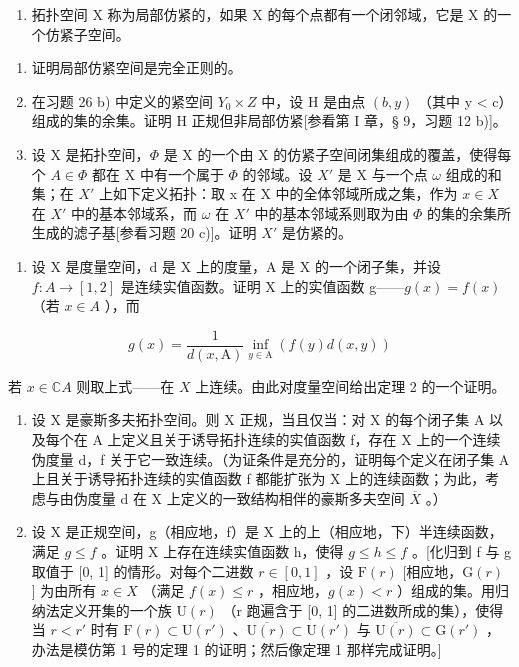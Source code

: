 \begin{enumerate}
\def\labelenumi{\arabic{enumi})}
\setcounter{enumi}{26}
\tightlist
\item
  拓扑空间 X 称为局部仿紧的，如果 X 的每个点都有一个闭邻域，它是 X 的一个仿紧子空间。
\end{enumerate}

\begin{enumerate}
\def\labelenumi{\alph{enumi})}
\item
  证明局部仿紧空间是完全正则的。
\item
  在习题 26 b) 中定义的紧空间 \(Y_{0} \times Z\) 中，设 H 是由点 \((b, y)\) （其中 y \textless{} c）组成的集的余集。证明 H 正规但非局部仿紧{[}参看第 I 章，§ 9，习题 12 b){]}。
\item
  设 X 是拓扑空间，\(\Phi\) 是 X 的一个由 X 的仿紧子空间闭集组成的覆盖，使得每个 \(A \in \Phi\) 都在 X 中有一个属于 \(\Phi\) 的邻域。设 \(X'\) 是 X 与一个点 \(\omega\) 组成的和集；在 \(X'\) 上如下定义拓扑：取 x 在 X 中的全体邻域所成之集，作为 \(x \in X\) 在 \(X'\) 中的基本邻域系，而 \(\omega\) 在 \(X'\) 中的基本邻域系则取为由 \(\Phi\) 的集的余集所生成的滤子基{[}参看习题 20 c){]}。证明 \(X'\) 是仿紧的。
\end{enumerate}

\begin{enumerate}
\def\labelenumi{\arabic{enumi})}
\setcounter{enumi}{27}
\tightlist
\item
  设 X 是度量空间，d 是 X 上的度量，A 是 X 的一个闭子集，并设 \(f: A \to [1, 2]\) 是连续实值函数。证明 X 上的实值函数 g——\(g(x) = f(x)\) （若 \(x \in A\) ），而
\end{enumerate}

\[
g (x) = \frac {\mathrm{1}}{d (x , \mathrm{A})} \inf _ {y \in \mathrm{A}} (f (y) d (x, y))
\]

若 \(x \in \mathbb{C}A\) 则取上式——在 \(X\) 上连续。由此对度量空间给出定理 2 的一个证明。

\begin{enumerate}
\def\labelenumi{\arabic{enumi})}
\setcounter{enumi}{28}
\item
  设 X 是豪斯多夫拓扑空间。则 X 正规，当且仅当：对 X 的每个闭子集 A 以及每个在 A 上定义且关于诱导拓扑连续的实值函数 f，存在 X 上的一个连续伪度量 d，f 关于它一致连续。（为证条件是充分的，证明每个定义在闭子集 A 上且关于诱导拓扑连续的实值函数 f 都能扩张为 X 上的连续函数；为此，考虑与由伪度量 d 在 X 上定义的一致结构相伴的豪斯多夫空间 \(\overline{X}\) 。）
\item
  设 X 是正规空间，g（相应地，f）是 X 上的上（相应地，下）半连续函数，满足 \(g \leqslant f\) 。证明 X 上存在连续实值函数 h，使得 \(g \leqslant h \leqslant f\) 。{[}化归到 f 与 g 取值于 {[}0, 1{]} 的情形。对每个二进数 \(r \in [0, 1]\) ，设 \(\mathrm{F}(r)\) {[}相应地，\(\mathrm{G}(r)\) {]} 为由所有 \(x \in X\) （满足 \(f(x) \leqslant r\) ，相应地，\(g(x) < r\) ）组成的集。用归纳法定义开集的一个族 \(\mathrm{U}(r)\) （r 跑遍含于 {[}0, 1{]} 的二进数所成的集），使得当 \(r < r'\) 时有 \(\mathrm{F}(r) \subset \mathrm{U}(r')\) 、\(\overline{\mathrm{U}(r)} \subset \mathrm{U}(r')\) 与 \(\overline{\mathrm{U}(r)} \subset \mathrm{G}(r')\) ，办法是模仿第 1 号的定理 1 的证明；然后像定理 1 那样完成证明。{]}
\end{enumerate}
\relax{}

